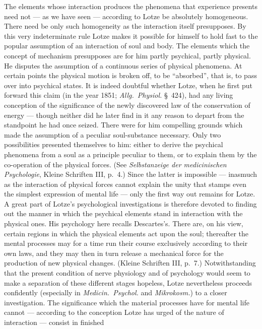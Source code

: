 \documentclass[12pt,a4paper]{book}
\newcommand{\opage}[1]{\marginnote{\footnotesize\textit{[#1]}}}
\begin{document}
\opage{522}The elements whose interaction produces the phenomena that experience presents
need not --- as we have seen --- according to Lotze be absolutely homogeneous.
There need be only such homogeneity as the interaction itself presupposes. By
this very indeterminate rule Lotze makes it possible for himself to hold fast to
the popular assumption of an interaction of soul and body. The elements which the
concept of mechanism presupposes are for him partly psychical, partly physical.
He disputes the assumption of a continuous series of physical phenomena. At
certain points the physical motion is broken off, to be ``absorbed'', that is, to pass
over into psychical states. It is indeed doubtful whether Lotze, when he first
put forward this claim (in the year 1851; \textit{Allg.\ Physiol.} §~424), had
any living conception of the significance of the newly discovered law of the
conservation of energy --- though neither did he later find in it any reason to
depart from the standpoint he had once seized. There were for him compelling
grounds which made the assumption of a peculiar soul-substance necessary. Only
two possibilities presented themselves to him: either to derive the psychical
phenomena from a soul as a principle peculiar to them, or to explain them by the
co-operation of the physical forces. (See \textit{Selbstanzeige der medicinischen
Psychologie}, Kleine Schriften III, p.~4.) Since the latter is impossible ---
inasmuch as the interaction of physical forces cannot explain the unity that
stamps even the simplest expression of mental life --- only the first way out
remains for Lotze. A great part of Lotze's psychological investigations is
therefore devoted to finding out the manner in which the psychical elements stand
in interaction with the physical ones. His psychology here recalls Descartes's.
There are, on his view, certain regions in which the physical elements act upon
the soul; thereafter the mental processes may for a time run their course
exclusively according to their own laws, and they may then in turn release a
mechanical force for the production of new physical changes. (Kleine Schriften
III, p.~7.) Notwithstanding that the present \opage{523}condition of nerve physiology and of
psychology would seem to make a separation of these different stages hopeless,
Lotze nevertheless proceeds confidently (especially in \textit{Medicin.\
Psychol.} and \textit{Mikrokosm.}) to a closer investigation. The significance
which the material processes have for mental life cannot --- according to the
conception Lotze has urged of the nature of interaction --- consist in finished
\end{document}
